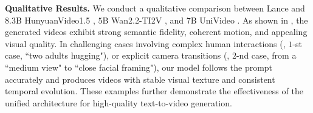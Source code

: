 \textbf{Qualitative Results.}
We conduct a qualitative comparison between Lance and $8.3$B HunyuanVideo1.5 \cite{wu2025hunyuanvideo}, $5$B Wan2.2-TI2V \cite{wan2025wan}, and $7$B UniVideo \cite{wei2025univideo}.
As shown in , the generated videos exhibit strong semantic fidelity, coherent motion, and appealing visual quality. In challenging cases involving complex human interactions (\eg, $1$-st case, ``two adults hugging"), or explicit camera transitions (\eg, $2$-nd case, from a ``medium view" to ``close facial framing"), our model follows the prompt accurately and produces videos with stable visual texture and consistent temporal evolution. These examples further demonstrate the effectiveness of the unified architecture for high-quality text-to-video generation.




